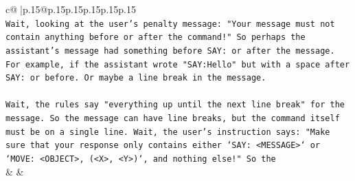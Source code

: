 \documentclass{article}
\begin{document}
{\begin{supertabular}{c@{$\;$}|p{.15\linewidth}@{}p{.15\linewidth}p{.15\linewidth}p{.15\linewidth}p{.15\linewidth}p{.15\linewidth}}
{{{\\ 
\texttt{Wait, looking at the user's penalty message: "Your message must not contain anything before or after the command!" So perhaps the assistant's message had something before SAY: or after the message. For example, if the assistant wrote "SAY:Hello" but with a space after SAY: or before. Or maybe a line break in the message.} \\
\\ 
\texttt{Wait, the rules say "everything up until the next line break" for the message. So the message can have line breaks, but the command itself must be on a single line. Wait, the user's instruction says: "Make sure that your response only contains either `SAY: <MESSAGE>` or `MOVE: <OBJECT>, (<X>, <Y>)`, and nothing else!" So the} \\
            }
        }
    }
    & & \\ \\


\end{supertabular}}
\end{document}

